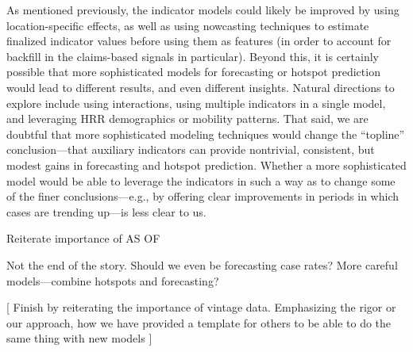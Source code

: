 \documentclass[9pt,twocolumn,twoside,lineno]{pnas-new}
\begin{document}
As mentioned previously, the indicator models could likely be improved by using 
location-specific effects, as well as using nowcasting techniques to estimate
finalized indicator values before using them as features (in order to account
for backfill in the claims-based signals in particular).  Beyond this, it is
certainly possible that more sophisticated models for forecasting or hotspot
prediction would lead to different results, and even different
insights. Natural directions to explore include using interactions, using
multiple indicators in a single model, and leveraging HRR demographics or
mobility patterns.  That said, we are doubtful that more sophisticated modeling
techniques would change the ``topline'' conclusion---that auxiliary indicators 
can provide nontrivial, consistent, but modest gains in forecasting and
hotspot prediction. Whether a more sophisticated model would be able to leverage
the indicators in such a way as to change some of the finer conclusions---e.g.,
by offering clear improvements in periods in which cases are trending up---is 
less clear to us. 

Reiterate importance of AS OF

Not the end of the story.  Should we even be forecasting case rates?  More
careful models---combine hotspots and forecasting?

[  Finish by reiterating the importance of vintage data.  Emphasizing the rigor
or our approach, how we have provided a template for others to be able to do the
same thing with new models ]




\showmatmethods{} %


\showacknow{} %


\end{document}
